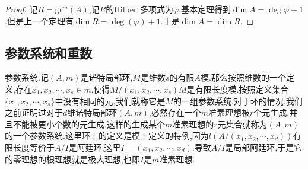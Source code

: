 \begin{enumerate}
\begin{proof}
    	记$R=\mathrm{gr}^m(A)$,记$R$的Hilbert多项式为$\varphi$,基本定理得到$\dim A=\deg\varphi+1$.但是上一个定理有$\dim R=\deg(\varphi)+1$.于是$\dim A=\dim R$.
    \end{proof}
\end{enumerate}
\newpage
\subsection{参数系统和重数}

参数系统.记$(A,m)$是诺特局部环,$M$是维数$s$的有限$A$模.那么按照维数的一个定义,存在$x_1,x_2,\cdots,x_s\in m$,使得$M/(x_1,x_2,\cdots,x_s)M$是有限长度模.按照定义集合$\{x_1,x_2,\cdots,x_s\}$中没有相同的元,我们就称它是$M$的一组参数系统.对于环的情况,我们之前证明过对于$d$维诺特局部环$(A,m)$,必然存在一个$m$准素理想被$r$个元生成,并且不能被更小个数的元生成.这样的生成某个$m$准素理想的$r$元集合就称为$(A,m)$的一个参数系统.这里环上的定义是模上定义的特例,因为$l(A/(x_1,x_2,\cdots,x_d))$有限长度等价于$A/I$是阿廷环,这里$I=(x_1,x_2,\cdots,x_d)$.导致$A/I$是局部阿廷环,于是它的零理想的根理想就是极大理想,也即$I$是$m$准素理想.

